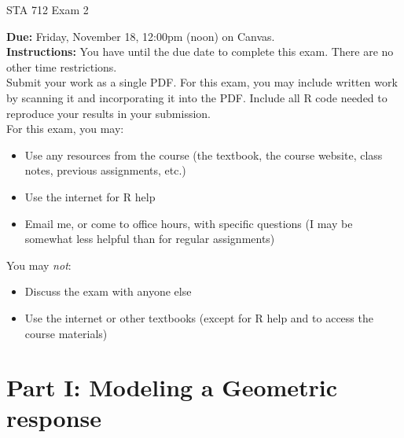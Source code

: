 \documentclass[11pt]{article}
\begin{document}
\begin{center}
\Large
STA 712 Exam 2\\
\normalsize
\vspace{5mm}
\end{center}

\noindent \textbf{Due:} Friday, November 18, 12:00pm (noon) on Canvas.\\ 

\noindent \textbf{Instructions:} You have until the due date to complete this exam. There are no other time restrictions.\\

\noindent Submit your work as a single PDF. For this exam, you may include written work by scanning it and incorporating it into the PDF. Include all R code needed to reproduce your results in your submission.\\

\noindent For this exam, you may:
\begin{itemize}
\item Use any resources from the course (the textbook, the course website, class notes, previous assignments, etc.)
\item Use the internet for R help
\item Email me, or come to office hours, with specific questions (I may be somewhat less helpful than for regular assignments)
\end{itemize}
You may \textit{not}:
\begin{itemize}
\item Discuss the exam with anyone else
\item Use the internet or other textbooks (except for R help and to access the course materials)
\end{itemize}

\newpage

\section*{Part I: Modeling a Geometric response}
\end{document}
